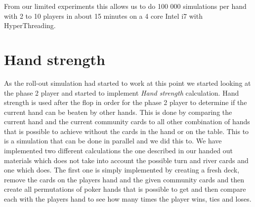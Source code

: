 \documentclass[titlepage, a4paper]{article}
\begin{document}
From our limited experiments this allows us to do 100 000 simulations per hand with
2 to 10 players in about 15 minutes on a 4 core Intel i7 with HyperThreading.

\section{Hand strength}\label{hand strength}
As the roll-out simulation had started to work at this point we started looking at
the phase 2 player and started to implement \textit{Hand strength} calculation.
Hand strength is used after the flop in order for the phase 2 player to determine if
the current hand can be beaten by other hands. This is done by comparing the current
hand and the current community cards to all other combination of hands that is possible
to achieve without the cards in the hand or on the table. This to is a simulation
that can be done in parallel and we did this to. We have implemented two different
calculations the one described in our handed out materials which does not take into
account the possible turn and river cards and one which does. The first one is simply
implemented by creating a fresh deck, remove the cards on the players hand and the
given community cards and then create all permutations of poker hands that is possible
to get and then compare each with the players hand to see how many times the player
wins, ties and loses.
\end{document}
